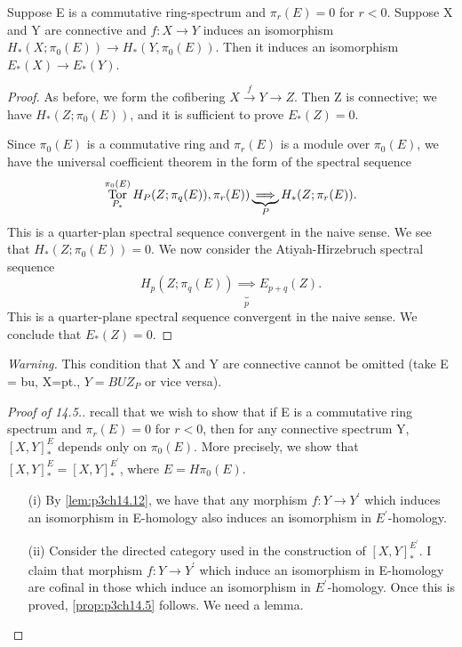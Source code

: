 \documentclass[../main]{subfiles}
\begin{document}
\begin{lemma} \label{lem:p3ch14.13}
Suppose E is a commutative ring-spectrum and $ \pi_{r}(E)=0$ for $r<0$. Suppose X and Y are connective and $f\colon  X \to  Y $ induces an isomorphism $H_{\ast}(X;\pi_{0}(E)) \to H_{\ast}(Y, \pi_{0}(E))$. Then it induces an isomorphism $E_{\ast}(X) \to E_{\ast}(Y)$.

\begin{proof} 
  As before, we form the cofibering $X \xrightarrow{f} Y \to Z$. Then Z is connective; we have $H_{\ast}(Z;\pi_{0}(E))$, and it is sufficient to prove $E_{\ast}(Z)=0$.

  Since $ \pi_{0}(E)$ is a commutative ring and $ \pi_{r}(E)$ is a module over $ \pi_{0}(E)$, we have the universal coefficient theorem in the form of the spectral sequence
  $$
  \mathop{\mathrm{Tor}}_{P_{\ast}}^{\pi_{0}(E)}  H_{P}(Z;\pi_{q}(E)), \pi_{r}(E)) \underbrace{\implies}_{P} H_{\ast}(Z;\pi_{r}(E)). 
  $$ 
  This is a quarter-plan spectral sequence convergent in the naive sense. We see that $H_{\ast}(Z;\pi_{0}(E))=0$. We now consider the Atiyah-Hirzebruch spectral sequence
  $$
    H_{p}(Z;\pi_{q}(E)) \underbrace{\implies}_{p} E_{p+q} (Z). 
  $$ 
  This is a quarter-plane spectral sequence convergent in the naive sense. We conclude that $E_{\ast}(Z)=0$.
\end{proof}
\emph{Warning.} This condition that X and Y are connective cannot be omitted (take E = bu, X=pt., $Y=BUZ_P$ or vice versa).
\end{lemma}

\begin{proof}[Proof of 14.5.] 
  recall that we wish to show that if E is a commutative ring spectrum and $\pi_{r}(E)=0$ for $r<0$, then for any connective spectrum Y, $\left[X,Y\right]^E_{\ast}$ depends only on  $\pi_{0}(E)$. More precisely, we show that $\left[X,Y\right]^E_{\ast}=\left[X,Y\right]^{E^{\prime}}_{\ast}$, where $E= H \pi_{0}(E)$.
  \begin{enumerate} 
    \item [(i)] By \ref{lem:p3ch14.12}, we have that any morphism $f\colon  Y \to  Y^{\prime} $ which induces an isomorphism in E-homology also induces an isomorphism in $E^{\prime}$-homology.
    \item [(ii)] Consider the directed category used in the construction of $\left[X,Y\right]^{E^{\prime}}_{\ast}$. I claim that morphism $f\colon  Y \to  Y^{\prime} $ which induce an isomorphism in E-homology are cofinal in those which induce an isomorphism in $E^{\prime}$-homology. Once this is proved, \ref{prop:p3ch14.5} follows. We need a lemma.
  \end{enumerate}
\end{proof}
\end{document}
